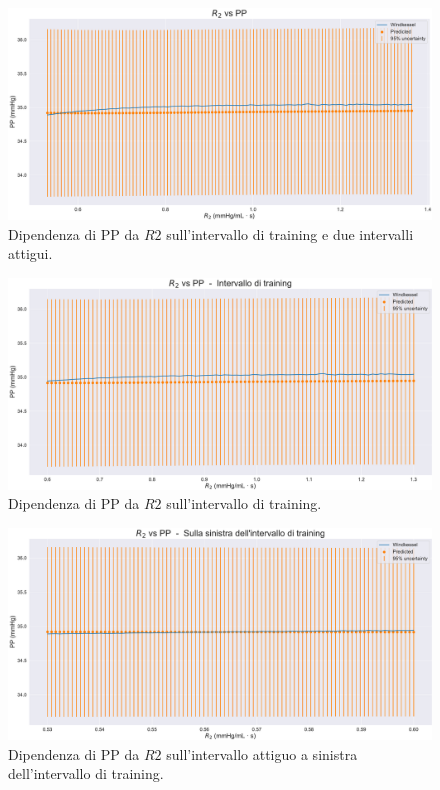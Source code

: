 \vspace{0.9cm}

\begin{figure}[!htb]
    \centering
    \includegraphics[width=1\textwidth]{images/Training (risultati)/PP/PP - R2 - full.pdf}
    \caption{Dipendenza di PP da $R2$ sull'intervallo di training e due intervalli attigui.}
    \label{PP - R2 - full}
\end{figure}

\vspace{0.32cm}

\begin{figure}[!htb]
    \centering
    \includegraphics[width=1\textwidth]{images/Training (risultati)/PP/PP - R2 - training.pdf}
    \caption{Dipendenza di PP da $R2$ sull'intervallo di training.}
    \label{PP - R2 - training}
\end{figure}

\begin{figure}
    \centering
    \includegraphics[width=1\textwidth]{images/Training (risultati)/PP/PP - R2 - sx.pdf}
    \caption{Dipendenza di PP da $R2$ sull'intervallo attiguo a sinistra dell'intervallo di training.}
    \label{PP - R2 - sx}
\end{figure}



